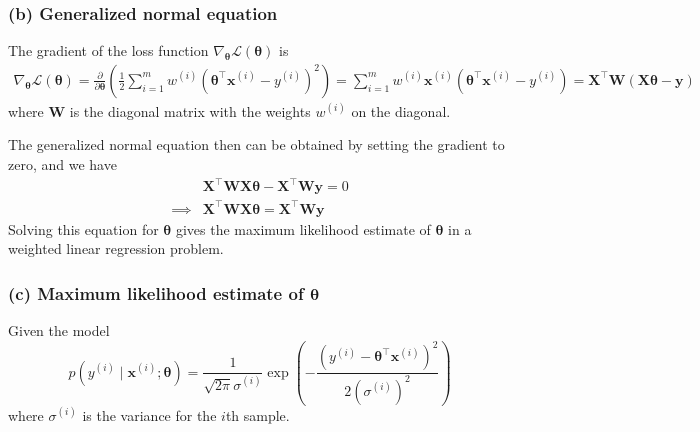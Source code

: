 \clearpage
\subsubsection*{(b) Generalized normal equation}

The gradient of the loss function \( \nabla_{\boldsymbol{\theta}} \mathcal{L}(\boldsymbol{\theta}) \) is
\begin{align*}
    \nabla_{\boldsymbol{\theta}} \mathcal{L}(\boldsymbol{\theta})
    =
    \frac{\partial}{\partial \boldsymbol{\theta}}
    \left(
    \frac{1}{2}
    \sum_{i=1}^{m}
    w^{(i)} {\left(\boldsymbol{\theta}^\top \mathbf{x}^{(i)}-y^{(i)}\right)}^{2}
    \right)
    =
    \sum_{i=1}^{m}
    w^{(i)} \mathbf{x}^{(i)} \left(\boldsymbol{\theta}^\top \mathbf{x}^{(i)}-y^{(i)}\right)
    =
    \mathbf{X}^\top \mathbf{W} (\mathbf{X} \boldsymbol{\theta} - \mathbf{y})
\end{align*}
where \( \mathbf{W} \) is the diagonal matrix with the weights \( w^{(i)} \) on the diagonal.

The generalized normal equation then can be obtained by setting the gradient to zero, and we have
\begin{align*}
     &
    \mathbf{X}^\top \mathbf{W} \mathbf{X} \boldsymbol{\theta} - \mathbf{X}^\top \mathbf{W} \mathbf{y}
    =
    0
    \\
    \implies
     &
    \boxed{
        \mathbf{X}^\top \mathbf{W} \mathbf{X} \boldsymbol{\theta}
        =
        \mathbf{X}^\top \mathbf{W} \mathbf{y}
    }
\end{align*}
Solving this equation for \( \boldsymbol{\theta} \) gives the maximum likelihood estimate of \( \boldsymbol{\theta} \) in a weighted linear regression problem.

\subsubsection*{(c) Maximum likelihood estimate of \( \boldsymbol{\theta} \)}

Given the model
\begin{equation*}
    p\left(y^{(i)} \mid \mathbf{x}^{(i)} ; \boldsymbol{\theta}\right)=\frac{1}{\sqrt{2 \pi} \sigma^{(i)}} \exp \left(-\frac{{\left(y^{(i)}-\boldsymbol{\theta}^{\top} \mathbf{x}^{(i)}\right)}^{2}}{2{\left(\sigma^{(i)}\right)}^{2}}\right)
\end{equation*}
where \( \sigma^{(i)} \) is the variance for the \( i \)th sample.

